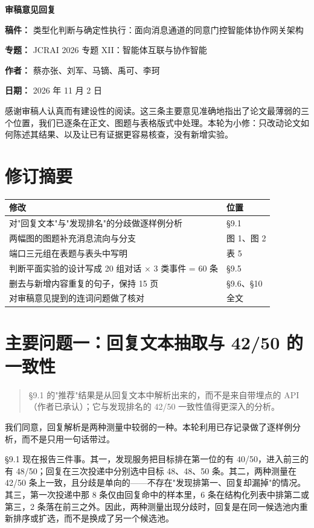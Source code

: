 \documentclass[11pt,a4paper]{article}
\begin{document}
\begin{center}{\Large\bfseries 审稿意见回复}\end{center}
\vspace{0.2em}
\textbf{稿件：} 类型化判断与确定性执行：面向消息通道的同意门控智能体协作网关架构

\textbf{专题：} JCRAI 2026 专题 XII：智能体互联与协作智能

\textbf{作者：} 蔡亦张、刘军、马镝、禹可、李珂

\textbf{日期：} 2026 年 11 月 2 日

感谢审稿人认真而有建设性的阅读。这三条主要意见准确地指出了论文最薄弱的三个位置，我们已逐条在正文、图题与表格版式中处理。本轮为小修：只改动论文如何陈述其结果、以及让已有证据更容易核查，没有新增实验。

\section*{修订摘要}
\begin{center}\small
\begin{tabularx}{\textwidth}{@{}XX@{}}
\toprule
\textbf{修改} & \textbf{位置} \\
\midrule
对"回复文本"与"发现排名"的分歧做逐样例分析 & §9.1 \\
两幅图的图题补充消息流向与分支 & 图 1、图 2 \\
端口三元组在表题与表头中写明 & 表 5 \\
判断平面实验的设计写成 20 组对话 × 3 类事件 = 60 条 & §9.5 \\
删去与新增内容重复的句子，保持 15 页 & §9.6、§10 \\
对审稿意见提到的连词问题做了核对 & 全文 \\
\bottomrule
\end{tabularx}
\end{center}
\section*{主要问题一：回复文本抽取与 42/50 的一致性}
\begin{quote}\small §9.1 的"推荐"结果是从回复文本中解析出来的，而不是来自带埋点的 API（作者已承认）；它与发现排名的 42/50 一致性值得更深入的分析。\end{quote}
我们同意，回复解析是两种测量中较弱的一种。本轮利用已存记录做了逐样例分析，而不是只用一句话带过。

§9.1 现在报告三件事。其一，发现服务把目标排在第一位的有 40/50，进入前三的有 48/50；回复在三次投递中分别选中目标 48、48、50 条。其二，两种测量在 42/50 条上一致，且分歧是单向的——不存在"发现排第一、回复却漏掉"的情况。其三，第一次投递中那 8 条仅由回复命中的样本里，6 条在结构化列表中排第二或第三，2 条落在前三之外。因此，两种测量出现分歧时，回复是在同一候选池内重新排序或扩选，而不是换成了另一个候选池。
\end{document}
